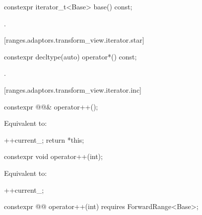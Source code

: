 \begin{itemdecl}
constexpr iterator_t<Base> base() const;
\end{itemdecl}

\begin{itemdescr}
\pnum
\returns {}.
\end{itemdescr}

[ranges.adaptors.transform_view.iterator.star]{}

\begin{itemdecl}
constexpr decltype(auto) operator*() const;
\end{itemdecl}

\begin{itemdescr}
\pnum
\returns {}.
\end{itemdescr}

[ranges.adaptors.transform_view.iterator.inc]{}

\begin{itemdecl}
constexpr @@& operator++();
\end{itemdecl}

\begin{itemdescr}
\pnum
\effects Equivalent to:
\begin{codeblock}
++current_;
return *this;
\end{codeblock}
\end{itemdescr}

\begin{itemdecl}
constexpr void operator++(int);
\end{itemdecl}

\begin{itemdescr}
\pnum
\effects Equivalent to:
\begin{codeblock}
++current_;
\end{codeblock}
\end{itemdescr}

\begin{itemdecl}
constexpr @@ operator++(int) requires ForwardRange<Base>;
\end{itemdecl}

